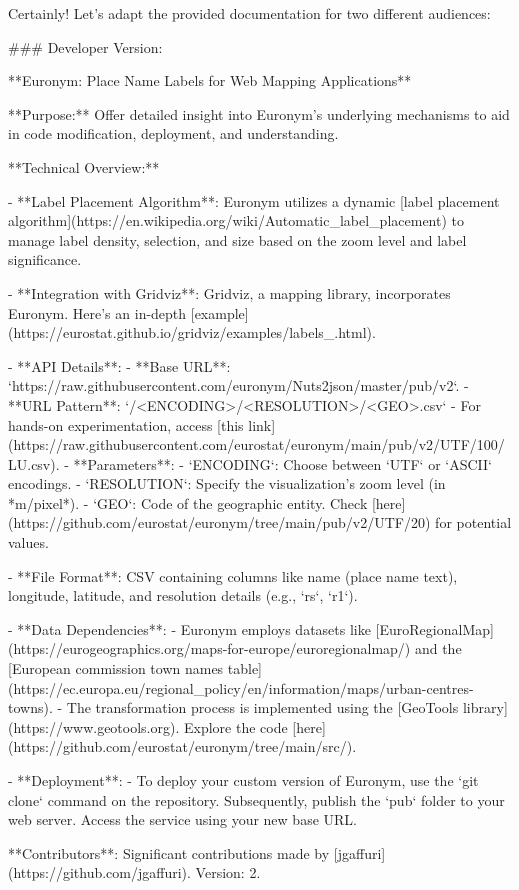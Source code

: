 Certainly! Let's adapt the provided documentation for two different audiences:

### Developer Version:

**Euronym: Place Name Labels for Web Mapping Applications**

**Purpose:** Offer detailed insight into Euronym's underlying mechanisms to aid in code modification, deployment, and understanding.

**Technical Overview:**

- **Label Placement Algorithm**: Euronym utilizes a dynamic [label placement algorithm](https://en.wikipedia.org/wiki/Automatic_label_placement) to manage label density, selection, and size based on the zoom level and label significance. 

- **Integration with Gridviz**: Gridviz, a mapping library, incorporates Euronym. Here's an in-depth [example](https://eurostat.github.io/gridviz/examples/labels_.html).

- **API Details**:
  - **Base URL**: `https://raw.githubusercontent.com/euronym/Nuts2json/master/pub/v2`. 
  - **URL Pattern**: `/<ENCODING>/<RESOLUTION>/<GEO>.csv`
  - For hands-on experimentation, access [this link](https://raw.githubusercontent.com/eurostat/euronym/main/pub/v2/UTF/100/LU.csv).
  - **Parameters**:
    - `ENCODING`: Choose between `UTF` or `ASCII` encodings. 
    - `RESOLUTION`: Specify the visualization's zoom level (in *m/pixel*).
    - `GEO`: Code of the geographic entity. Check [here](https://github.com/eurostat/euronym/tree/main/pub/v2/UTF/20) for potential values.

- **File Format**: CSV containing columns like name (place name text), longitude, latitude, and resolution details (e.g., `rs`, `r1`).

- **Data Dependencies**:
  - Euronym employs datasets like [EuroRegionalMap](https://eurogeographics.org/maps-for-europe/euroregionalmap/) and the [European commission town names table](https://ec.europa.eu/regional_policy/en/information/maps/urban-centres-towns).
  - The transformation process is implemented using the [GeoTools library](https://www.geotools.org). Explore the code [here](https://github.com/eurostat/euronym/tree/main/src/).

- **Deployment**:
  - To deploy your custom version of Euronym, use the `git clone` command on the repository. Subsequently, publish the `pub` folder to your web server. Access the service using your new base URL.

**Contributors**: Significant contributions made by [jgaffuri](https://github.com/jgaffuri). Version: 2.

